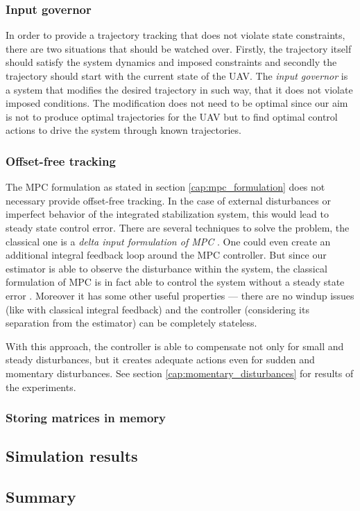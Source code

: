 \subsubsection{Input governor}
\label{cap:input_governor}

In order to provide a trajectory tracking that does not violate state constraints, there are two situations that should be watched over. Firstly, the trajectory itself should satisfy the system dynamics and imposed constraints and secondly the trajectory should start with the current state of the UAV. The \emph{input governor} is a system that modifies the desired trajectory in such way, that it does not violate imposed conditions. The modification does not need to be optimal since our aim is not to produce optimal trajectories for the UAV but to find optimal control actions to drive the system through known trajectories.

\subsubsection{Offset-free tracking}
\label{cap:offset_free_tracking}

The MPC formulation as stated in section \ref{cap:mpc_formulation} does not necessary provide offset-free tracking. In the case of external disturbances or imperfect behavior of the integrated stabilization system, this would lead to steady state control error. There are several techniques to solve the problem, the classical one is a \emph{delta input formulation of MPC} \citep{borrelli2007offsetfree}. One could even create an additional integral feedback loop around the MPC controller. But since our estimator is able to observe the disturbance within the system, the classical formulation of MPC is in fact able to control the system without a steady state error \citep{rossiter2013mpcpracticalapproach}. Moreover it has some other useful properties --- there are no windup issues (like with classical integral feedback) and the controller (considering its separation from the estimator) can be completely stateless. 

With this approach, the controller is able to compensate not only for small and steady disturbances, but it creates adequate actions even for sudden and momentary disturbances. See section \ref{cap:momentary_disturbances} for results of the experiments.

\subsubsection{Storing matrices in memory}

\subsection{Simulation results}

\subsection{Summary}